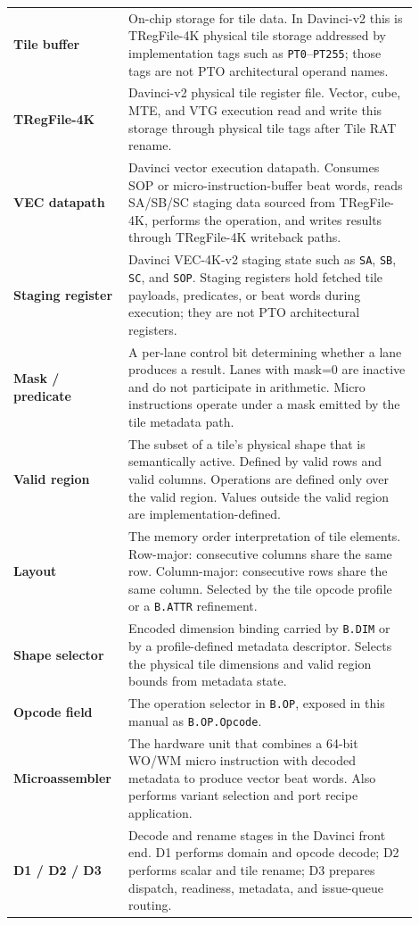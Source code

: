 \begin{longtable}{@{}L{0.22\linewidth}L{0.68\linewidth}@{}}
\textbf{Tile buffer} & On-chip storage for tile data. In Davinci-v2 this is TRegFile-4K physical tile storage addressed by implementation tags such as \texttt{PT0}--\texttt{PT255}; those tags are not PTO architectural operand names. \\
\textbf{TRegFile-4K} & Davinci-v2 physical tile register file. Vector, cube, MTE, and VTG execution read and write this storage through physical tile tags after Tile RAT rename. \\
\textbf{VEC datapath} & Davinci vector execution datapath. Consumes SOP or micro-instruction-buffer beat words, reads SA/SB/SC staging data sourced from TRegFile-4K, performs the operation, and writes results through TRegFile-4K writeback paths. \\
\textbf{Staging register} & Davinci VEC-4K-v2 staging state such as \texttt{SA}, \texttt{SB}, \texttt{SC}, and \texttt{SOP}. Staging registers hold fetched tile payloads, predicates, or beat words during execution; they are not PTO architectural registers. \\
\textbf{Mask / predicate} & A per-lane control bit determining whether a lane produces a result. Lanes with mask=0 are inactive and do not participate in arithmetic. Micro instructions operate under a mask emitted by the tile metadata path. \\
\textbf{Valid region} & The subset of a tile's physical shape that is semantically active. Defined by valid rows and valid columns. Operations are defined only over the valid region. Values outside the valid region are implementation-defined. \\
\textbf{Layout} & The memory order interpretation of tile elements. Row-major: consecutive columns share the same row. Column-major: consecutive rows share the same column. Selected by the tile opcode profile or a \texttt{B.ATTR} refinement. \\
\textbf{Shape selector} & Encoded dimension binding carried by \texttt{B.DIM} or by a profile-defined metadata descriptor. Selects the physical tile dimensions and valid region bounds from metadata state. \\
\textbf{Opcode field} & The operation selector in \texttt{B.OP}, exposed in this manual as \texttt{B.OP.Opcode}. \\
\textbf{Microassembler} & The hardware unit that combines a 64-bit WO/WM micro instruction with decoded metadata to produce vector beat words. Also performs variant selection and port recipe application. \\
\textbf{D1 / D2 / D3} & Decode and rename stages in the Davinci front end. D1 performs domain and opcode decode; D2 performs scalar and tile rename; D3 prepares dispatch, readiness, metadata, and issue-queue routing. \\

\end{longtable}
